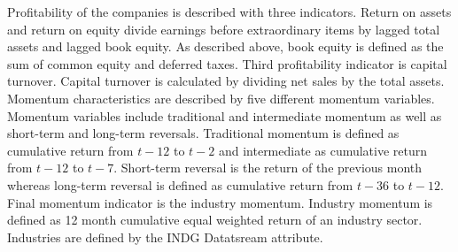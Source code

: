 \documentclass{article}
\begin{document}
Profitability of the companies is described with three indicators. Return on assets and return on equity divide earnings before extraordinary items by lagged total assets and lagged book equity. As described above, book equity is defined as the sum of common equity and deferred taxes. Third profitability indicator is capital turnover. Capital turnover is calculated by dividing net sales by the total assets. Momentum characteristics are described by five different momentum variables. Momentum variables include traditional and intermediate momentum as well as short-term and long-term reversals. Traditional momentum is defined as cumulative return from $t-12$ to $t-2$ and intermediate as cumulative return from $t-12$ to $t-7$. Short-term reversal is the return of the previous month whereas long-term reversal is defined as cumulative return from $t-36$ to $t-12$. Final momentum indicator is the industry momentum. Industry momentum is defined as 12 month cumulative equal weighted return of an industry sector. Industries are defined by the INDG Datatsream attribute. \par
\end{document}
